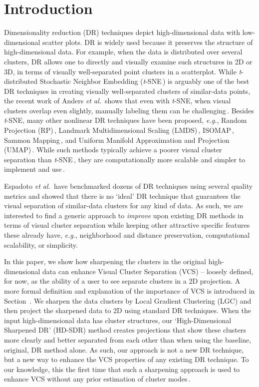 \documentclass[sagev,Afour,times]{sagej}
\begin{document}
\section{Introduction}
\label{sec:intro}
Dimensionality reduction (DR) techniques depict high-dimensional data with low-dimensional scatter plots. DR is widely used because it preserves the structure of high-dimensional data. For example, when the data is distributed over several clusters, DR allows one to directly and visually examine such structures in 2D or 3D, in terms of visually well-separated point clusters in a scatterplot. While \emph{t}-distributed Stochastic Neighbor Embedding (\emph{t}-SNE\,\cite{tsne:original}) is arguably one of the best DR techniques in creating visually well-separated clusters of similar-data points, the recent work of Anders \emph{et al.}\ shows that even with \emph{t}-SNE, when visual clusters overlap even slightly, manually labeling them can be challenging\,\cite{tsne:astro}. Besides \emph{t}-SNE, many other nonlinear DR techniques have been proposed, \emph{e.g.}, Random Projection (RP)\,\cite{RP1:randomProj,rp2:randomproj_survey}, Landmark Multidimensional Scaling (LMDS)\,\cite{lmds:original}, ISOMAP\,\cite{isomap:original}, Sammon Mapping\,\cite{sammonMapping:original}, and Uniform Manifold Approximation and Projection (UMAP)\,\cite{umap2018}. While such methods typically achieve a poorer visual cluster separation than \emph{t}-SNE\,\cite{dr:review,tsne:original}, they are computationally more scalable and simpler to implement and use\,\cite{mateusDR_survey2019}.

Espadoto \emph{et al.}\,\cite{mateusDR_survey2019} have benchmarked dozens of DR techniques using several quality metrics and showed that there is no `ideal' DR technique that guarantees the visual separation of similar-data clusters for any kind of data. As such, we are interested to find a generic approach to \emph{improve} upon existing DR methods in terms of visual cluster separation while keeping other attractive specific features these already have, \emph{e.g.}, neighborhood and distance preservation, computational scalability, or simplicity.

In this paper, we show how sharpening the clusters in the original high-dimensional data can enhance Visual Cluster Separation (VCS) -- loosely defined, for now, as the ability of a user to see separate clusters in a 2D projection. A more formal definition and explanation of the importance of VCS is introduced in Section~. We sharpen the data clusters by Local Gradient Clustering (LGC) and then project the sharpened data to 2D using standard DR techniques. When the input high-dimensional data has cluster structures, our
`High-Dimensional Sharpened DR' (HD-SDR) method creates projections that show these clusters more clearly and better separated from each other than when using the baseline, original, DR method alone. As such, our approach is not a new DR technique, but a new way to enhance the VCS properties of any existing DR technique.
To our knowledge, this the first time that such a sharpening approach is used to enhance VCS without any prior estimation of cluster modes\,\cite{realworld:banknote_sep}. 
\end{document}
